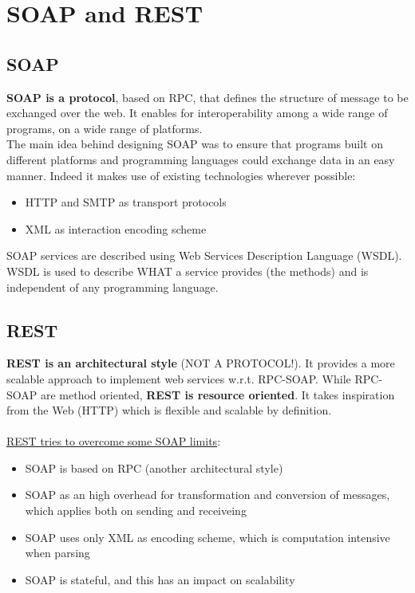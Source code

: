 \documentclass[10pt,a4paper]{article}
\begin{document}
\section{\LARGE SOAP and REST}
\subsection{SOAP}
\textbf{SOAP is a protocol}, based on RPC, that defines the structure of message to be exchanged over the web. It enables for interoperability among a wide range of programs, on a wide range of platforms.\\
The main idea behind designing SOAP was to ensure that programs built on different platforms and programming languages could exchange data in an easy manner.
Indeed it makes use of existing technologies wherever possible:
\begin{itemize}
	\item HTTP and SMTP as transport protocols
	\item XML as interaction encoding scheme
\end{itemize}
SOAP services are described using Web Services Description Language (WSDL). WSDL is used to describe WHAT a service provides (the methods) and is independent of any programming language.
\subsection{REST}
\textbf{REST is an architectural style} (NOT A PROTOCOL!). It provides a more scalable approach to implement web services w.r.t. RPC-SOAP. While RPC-SOAP are method oriented, \textbf{REST is resource oriented}. It takes inspiration from the Web (HTTP) which is flexible and scalable by definition.
\\ \\ \uline{REST tries to overcome some SOAP limits}:
\begin{itemize}
	\item SOAP is based on RPC (another architectural style)
	\item SOAP as an high overhead for transformation and conversion of messages, which applies both on sending and receiveing
	\item SOAP uses only XML as encoding scheme, which is computation intensive when parsing
	\item SOAP is stateful, and this has an impact on scalability
\end{itemize}
\end{document}
